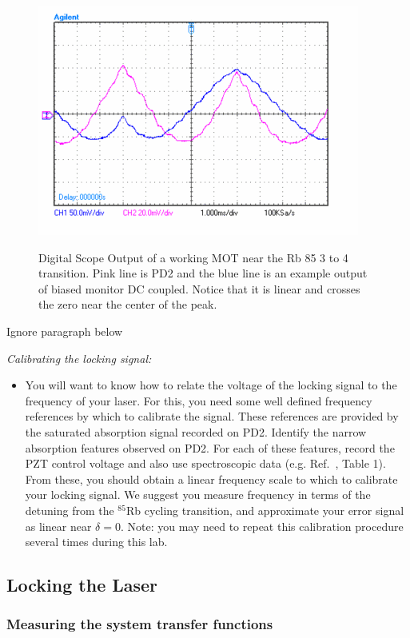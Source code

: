 \documentclass{../lab}
\begin{document}
\begin{figure}[h]
    \centering
    \href{http://experimentationlab.berkeley.edu/sites/default/files/images/400px-Rb3to4withErrorAC.GIF}{\includegraphics[width=0.5\linewidth]{images/400px-Rb3to4withErrorAC.png}}
    \caption{Digital Scope Output of a working MOT near the Rb 85 3 to 4 transition. Pink line is PD2 and the blue line is an example output of biased monitor DC coupled. Notice that it is linear and crosses the zero near the center of the peak.}
    \label{fig:400px-Rb3to4withErrorAC}
\end{figure}

Ignore paragraph below

\emph{Calibrating the locking signal:}

\begin{itemize}
    \item You will want to know how to relate the voltage of the locking signal to the frequency of your laser. For this, you need some well defined frequency references by which to calibrate the signal. These references are provided by the saturated absorption signal recorded on PD2. Identify the narrow absorption features observed on PD2. For each of these features, record the PZT control voltage and also use spectroscopic data (e.g. Ref.~\cite{BSCWriteup}, Table 1). From these, you should obtain a linear frequency scale to which to calibrate your locking signal. We suggest you measure frequency in terms of the detuning from the $^{85}$Rb cycling transition, and approximate your error signal as linear near $\delta = 0$. Note: you may need to repeat this calibration procedure several times during this lab.
\end{itemize}

\subsection{Locking the Laser}

\subsubsection{Measuring the system transfer functions}
\end{document}
